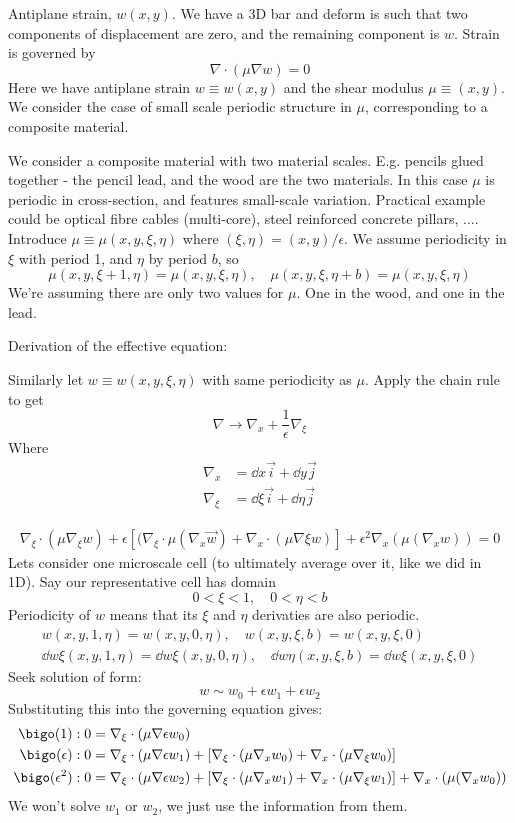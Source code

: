 \documentclass{X:/Documents/Coding/Latex/myassignment}
\begin{document}
Antiplane strain, $w(x,y)$. We have a 3D bar and deform is such that two components of displacement are zero, and the remaining component is $w$. 
Strain is governed by
\[\nabla \cdot (\mu\nabla w) =0 \]
Here we have antiplane strain $w\equiv w(x,y)$ and the shear modulus $\mu \equiv (x,y)$. We consider the case of small scale periodic structure in $\mu$, corresponding to a composite material.


We consider a composite material with two material scales. E.g. pencils glued together - the pencil lead, and the wood are the two materials.
In this case $\mu$ is periodic in cross-section, and features small-scale variation. Practical example could be optical fibre cables (multi-core), steel reinforced concrete pillars, $\ldots$.
Introduce $\mu \equiv \mu(x,y,\xi,\eta)$ where $(\xi,\eta) = (x,y)/\epsilon$. We assume periodicity in $\xi$ with period 1, and $\eta$ by period $b$, so
\[\mu(x,y,\xi+1,\eta) = \mu(x,y,\xi,\eta), \quad \mu(x,y,\xi,\eta+b) =\mu(x,y,\xi,\eta)\]
We're assuming there are only two values for $\mu$. One in the wood, and one in the lead.

Derivation of the effective equation:

Similarly let $w \equiv w(x,y,\xi,\eta)$ with same periodicity as $\mu$. Apply the chain rule to get
\[\nabla \to \nabla_x + \frac1\epsilon \nabla_{\xi}\]
Where
\begin{align*}
    \nabla_x &= \dd{}x\vec i + \dd{}y\vec j\\
    \nabla_\xi &= \dd{}\xi \vec i + \dd{}\eta \vec j
\end{align*}

\begin{align*}
    \nabla_\xi \cdot(\mu\nabla_\xi w) + \epsilon[(\nabla_\xi \cdot \mu(\nabla_x \vec w) + \nabla_x \cdot (\mu\nabla\xi w)] + \epsilon^2 \nabla_x (\mu(\nabla_x w)) = 0
\end{align*}
Lets consider one microscale cell (to ultimately average over it, like we did in 1D). Say our representative cell has domain
\[0<\xi<1, \quad 0<\eta<b\]
Periodicity of $w$ means that its $\xi$ and $\eta$ derivaties are also periodic. 
\begin{align*}
 w(x,y,1,\eta) = w(x,y,0,\eta), \quad w(x,y,\xi,b) = w(x,y,\xi,0) \\
 \dd w\xi (x,y,1,\eta) = \dd w\xi(x,y,0,\eta), \quad  \dd w\eta (x,y,\xi,b) = \dd w\xi(x,y,\xi,0)  
\end{align*}
Seek solution of form:
\[w \sim w_0 + \epsilon w_1 + \epsilon w_2\]
Substituting this into the governing equation gives:
\begin{align*}
    \bigo(1) : 0&=\nabla_\xi \cdot (\mu \nabla \epsilon w_0)\\
    \bigo(\epsilon) : 0&=\nabla_\xi \cdot (\mu \nabla \epsilon w_1) + \left[\nabla_\xi \cdot (\mu\nabla_x w_0) + \nabla_x \cdot(\mu\nabla_\xi w_0)\right]\\
    \bigo(\epsilon^2) : 0&=\nabla_\xi \cdot (\mu \nabla \epsilon w_2) + \left[\nabla_\xi \cdot (\mu\nabla_x w_1) + \nabla_x \cdot(\mu\nabla_\xi w_1)\right] + \nabla_x\cdot(\mu(\nabla_x w_0))
\end{align*}
We won't solve $w_1$ or $w_2$, we just use the information from them.
\end{document}
